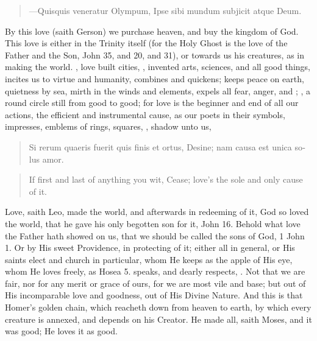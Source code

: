{\begin{latin}
\begin{verse}%
---Quisquis veneratur Olympum,
Ipse sibi mundum subjicit atque Deum.
\end{verse}%
\end{latin}

By this love (saith Gerson) we purchase heaven, and buy the
kingdom of God. This love is either in the Trinity itself (for
the Holy Ghost is the love of the Father and the Son, \etc{} John  35,
and  20, and  31), or towards us his creatures, as in making the
world. , love built cities, , invented
arts, sciences, and all good things, incites us to virtue and
humanity, combines and quickens; keeps peace on earth, quietness by
sea, mirth in the winds and elements, expels all fear, anger, and
; , a round circle still from good to
good; for love is the beginner and end of all our actions, the
efficient and instrumental cause, as our poets in their symbols,
impresses, emblems of rings, squares, \etc{}, shadow unto us,

\begin{latin}
\begin{verse}%
Si rerum quaeris fuerit quis finis et ortus,
Desine; nam causa est unica solus amor.
\end{verse}%
\end{latin}
\translationrule%
\begin{verse}%
If first and last of anything you wit,
Cease; love's the sole and only cause of it.
\end{verse}%

Love, saith Leo, made the world, and afterwards in redeeming of
it, God so loved the world, that he gave his only begotten son for it,
John  16. Behold what love the Father hath showed on us, that we
should be called the sons of God, 1 John  1. Or by His sweet
Providence, in protecting of it; either all in general, or His saints
elect and church in particular, whom He keeps as the apple of His eye,
whom He loves freely, as Hosea  5. speaks, and dearly respects,
. Not that we are fair, nor for
any merit or grace of ours, for we are most vile and base; but out of
His incomparable love and goodness, out of His Divine Nature. And this
is that Homer's golden chain, which reacheth down from heaven to earth,
by which every creature is annexed, and depends on his Creator. He made
all, saith Moses, and it was good; He loves it as good.

}
